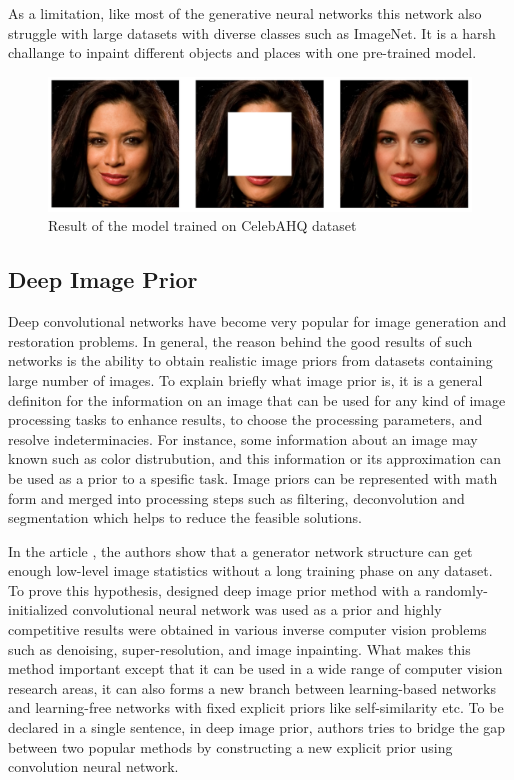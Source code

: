 As a limitation, like most of the generative neural networks this network also struggle with large datasets with diverse classes such as ImageNet. It is a harsh challange to inpaint different objects and places with one pre-trained model.

\begin{figure}[h!]
    \centering
    \includegraphics[width=14cm]{figures/chapter4/gmcnnout1.png}
    \vspace*{3mm}
    \caption{Result of the model trained on CelebAHQ dataset}
    \label{fig:gmcnn_celebA}
\end{figure}

\subsection{Deep Image Prior}

Deep convolutional networks have become very popular for image generation and restoration problems. In general, the reason behind the good results of such networks is the ability to obtain realistic image priors from datasets containing large number of images. To explain briefly what image prior is, it is a general definiton for the information on an image that can be used for any kind of image processing tasks to enhance results, to choose the processing parameters, and resolve indeterminacies. For instance, some information about an image may known such as color distrubution, and this information or its approximation can be used as a prior to a spesific task. Image priors can be represented with math form and merged into processing steps such as filtering, deconvolution and segmentation which helps to reduce the feasible solutions.

In the article \cite{deep_image_prior}, the authors show that a generator network structure can get enough low-level image statistics without a long training phase on any dataset. To prove this hypothesis, designed deep image prior method with a randomly-initialized convolutional neural network was used as a prior and highly competitive results were obtained in various inverse computer vision problems such as denoising, super-resolution, and image inpainting. What makes this method important except that it can be used in a wide range of computer vision research areas, it can also forms a new branch between learning-based networks and learning-free networks with fixed explicit priors like self-similarity etc. To be declared in a single sentence, in deep image prior, authors tries to bridge the gap between two popular methods by constructing a new explicit prior using convolution neural network.

